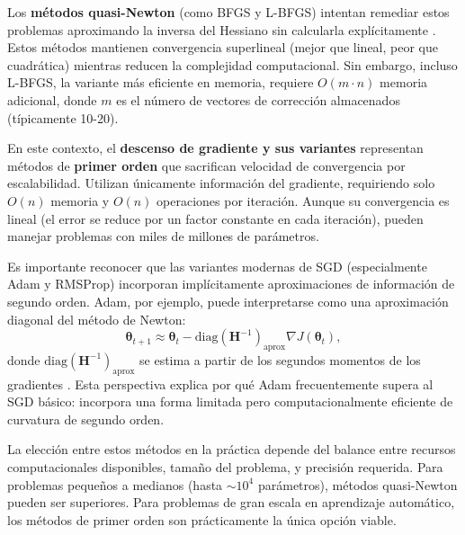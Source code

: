 \documentclass[12pt, spanish]{article}
\begin{document}
Los \textbf{métodos quasi-Newton} (como BFGS y L-BFGS) intentan remediar estos problemas aproximando la inversa del Hessiano sin calcularla explícitamente \cite{ref12}. Estos métodos mantienen convergencia superlineal (mejor que lineal, peor que cuadrática) mientras reducen la complejidad computacional. Sin embargo, incluso L-BFGS, la variante más eficiente en memoria, requiere $O(m \cdot n)$ memoria adicional, donde $m$ es el número de vectores de corrección almacenados (típicamente 10-20).

En este contexto, el \textbf{descenso de gradiente y sus variantes} representan métodos de \textbf{primer orden} que sacrifican velocidad de convergencia por escalabilidad. Utilizan únicamente información del gradiente, requiriendo solo $O(n)$ memoria y $O(n)$ operaciones por iteración. Aunque su convergencia es lineal (el error se reduce por un factor constante en cada iteración), pueden manejar problemas con miles de millones de parámetros.

Es importante reconocer que las variantes modernas de SGD (especialmente Adam y RMSProp) incorporan implícitamente aproximaciones de información de segundo orden. Adam, por ejemplo, puede interpretarse como una aproximación diagonal del método de Newton:
\[
\boldsymbol{\theta}_{t+1} \approx \boldsymbol{\theta}_t - \text{diag}(\mathbf{H}^{-1})_{\text{aprox}} \nabla J(\boldsymbol{\theta}_t),
\]
donde $\text{diag}(\mathbf{H}^{-1})_{\text{aprox}}$ se estima a partir de los segundos momentos de los gradientes \cite{ref13}. Esta perspectiva explica por qué Adam frecuentemente supera al SGD básico: incorpora una forma limitada pero computacionalmente eficiente de curvatura de segundo orden.

La elección entre estos métodos en la práctica depende del balance entre recursos computacionales disponibles, tamaño del problema, y precisión requerida. Para problemas pequeños a medianos (hasta $\sim 10^4$ parámetros), métodos quasi-Newton pueden ser superiores. Para problemas de gran escala en aprendizaje automático, los métodos de primer orden son prácticamente la única opción viable.
\end{document}
